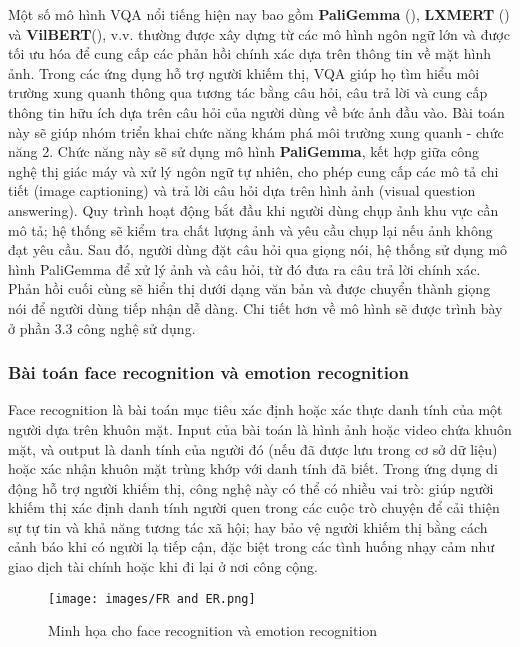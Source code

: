 \documentclass[a4paper,12pt]{article}
\begin{document}
Một số mô hình VQA nổi tiếng hiện nay bao gồm \textbf{PaliGemma} (\cite{beyer2024paligemma}), \textbf{LXMERT} (\cite{tan2019lxmert}) và \textbf{VilBERT}(\cite{lu2019vilbert}), v.v. thường được xây dựng từ các mô hình ngôn ngữ lớn và được tối ưu hóa để cung cấp các phản hồi chính xác dựa trên thông tin về mặt hình ảnh. Trong các ứng dụng hỗ trợ người khiếm thị, VQA giúp họ tìm hiểu môi trường xung quanh thông qua tương tác bằng câu hỏi, câu trả lời và cung cấp thông tin hữu ích dựa trên câu hỏi của người dùng về bức ảnh đầu vào. Bài toán này sẽ giúp nhóm triển khai chức năng khám phá môi trường xung quanh - chức năng 2. Chức năng này sẽ sử dụng mô hình \textbf{PaliGemma}, kết hợp giữa công nghệ thị giác máy và xử lý ngôn ngữ tự nhiên, cho phép cung cấp các mô tả chi tiết (image captioning) và trả lời câu hỏi dựa trên hình ảnh (visual question answering). Quy trình hoạt động bắt đầu khi người dùng chụp ảnh khu vực cần mô tả; hệ thống sẽ kiểm tra chất lượng ảnh và yêu cầu chụp lại nếu ảnh không đạt yêu cầu. Sau đó, người dùng đặt câu hỏi qua giọng nói, hệ thống sử dụng mô hình PaliGemma để xử lý ảnh và câu hỏi, từ đó đưa ra câu trả lời chính xác. Phản hồi cuối cùng sẽ hiển thị dưới dạng văn bản và được chuyển thành giọng nói để người dùng tiếp nhận dễ dàng. Chi tiết hơn về mô hình sẽ được trình bày ở phần 3.3 công nghệ sử dụng.

\subsubsection{Bài toán face recognition và emotion recognition}
Face recognition là bài toán mục tiêu xác định hoặc xác thực danh tính của một người dựa trên khuôn mặt. Input của bài toán là hình ảnh hoặc video chứa khuôn mặt, và output là danh tính của người đó (nếu đã được lưu trong cơ sở dữ liệu) hoặc xác nhận khuôn mặt trùng khớp với danh tính đã biết. Trong ứng dụng di động hỗ trợ người khiếm thị, công nghệ này có thể có nhiều vai trò: giúp người khiếm thị xác định danh tính người quen trong các cuộc trò chuyện để cải thiện sự tự tin và khả năng tương tác xã hội; hay bảo vệ người khiếm thị bằng cách cảnh báo khi có người lạ tiếp cận, đặc biệt trong các tình huống nhạy cảm như giao dịch tài chính hoặc khi đi lại ở nơi công cộng. 
\begin{figure}
    \centering
    \texttt{[image: images/FR and ER.png]}
    \caption{Minh họa cho face recognition và emotion recognition}
    \label{fig:enter-label}
\end{figure}
\end{document}
